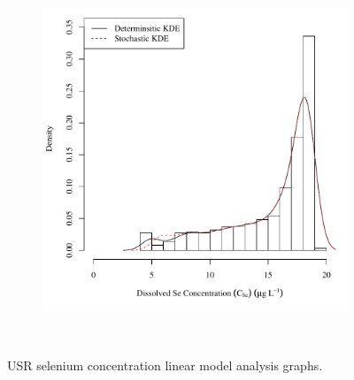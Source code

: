\begin{linenumbers}
\begin{landscape}
\begin{figure}
\begin{subfigure}{0.7\textwidth}
			\includegraphics[width=\tableCustomSize]{"Figures/Results_USR/Stochastic/c d&s est HRC"}
		\end{subfigure}\\
		\caption{USR selenium concentration linear model analysis graphs.}
	\end{figure}
\end{landscape}


\end{linenumbers}
